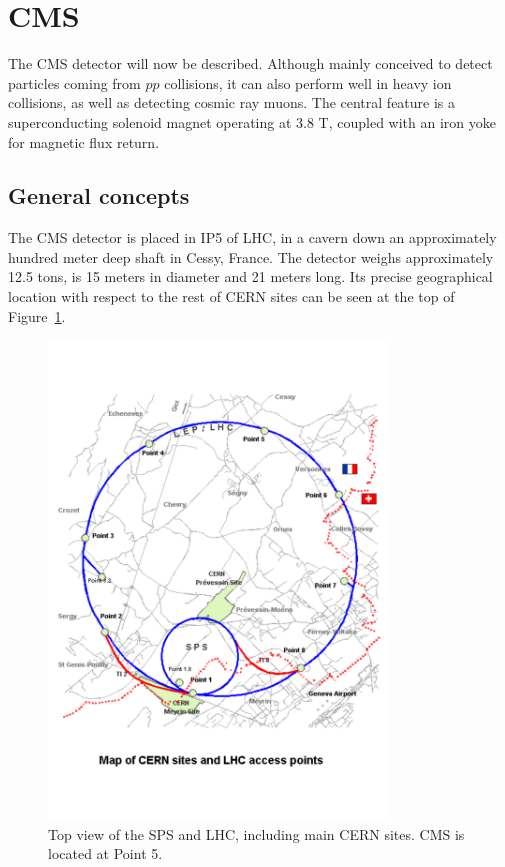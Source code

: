 \section{CMS}
\label{sec:CMS}

The CMS detector will now be described. Although mainly conceived to
detect particles coming from $pp$ collisions, it can also perform well
in heavy ion collisions, as well as detecting cosmic ray muons. The
central feature is a superconducting solenoid magnet operating at 3.8
T, coupled with an iron yoke for magnetic flux return.
\subsection{General concepts}
\label{sec:general}

The CMS detector is placed in IP5 of LHC, in a cavern down an
approximately hundred meter deep shaft in Cessy, France. The detector weighs approximately 12.5
tons, is 15 meters in diameter and 21 meters long. Its precise
geographical location with respect to the rest of CERN sites can be
seen at the top of Figure~\ref{fig:topLHC}.

\begin{figure}[t]
  \begin{center}
    \includegraphics[width=0.8\textwidth]{Chapters/xLHCMS/maplhc.pdf}
    \caption{Top view of the SPS and LHC, including main CERN
      sites. CMS is located at Point 5.}
    \label{fig:topLHC}
  \end{center}
\end{figure}


